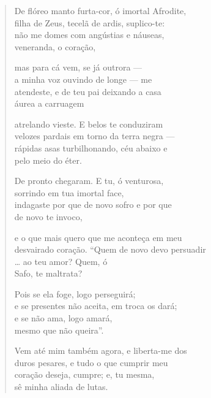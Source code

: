 \begin{verse}
De flóreo manto furta-cor, ó imortal Afrodite,\\
filha de Zeus, tecelã de ardis, suplico-te:\\
não me domes com angústias e náuseas,\\
veneranda, o coração,\\

\medskip

mas para cá vem, se já outrora ---\\
a minha voz ouvindo de longe --- me\\
atendeste, e de teu pai deixando a casa\\
áurea a carruagem\\

\medskip

atrelando vieste. E belos te conduziram\\
velozes pardais em torno da terra negra ---\\
rápidas asas turbilhonando, céu abaixo e\\
pelo meio do éter.\\

\medskip

De pronto chegaram. E tu, ó venturosa,\\
sorrindo em tua imortal face,\\
indagaste por que de novo sofro e por que\\
de novo te invoco,\\

\medskip

e o que mais quero que me aconteça em meu\\
desvairado coração. ``Quem de novo devo persuadir\\
\ldots{} ao teu amor? Quem, ó\\
Safo, te maltrata?\\

\medskip

Pois se ela foge, logo perseguirá;\\
e se presentes não aceita, em troca os dará;\\
e se não ama, logo amará,\\
mesmo que não queira''.\\

\medskip

Vem até mim também agora, e liberta-me dos\\
duros pesares, e tudo o que cumprir meu\\
coração deseja, cumpre; e, tu mesma,\\
sê minha aliada de lutas.
\end{verse}


